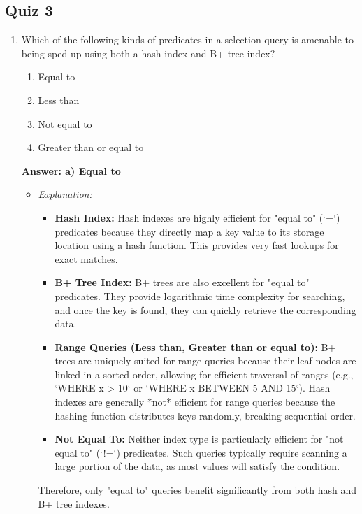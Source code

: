 \documentclass{article}
\begin{document}
\subsection*{Quiz 3}

\begin{enumerate}[label=\textbf{Question \arabic*.}]

    \item Which of the following kinds of predicates in a selection query is amenable to being sped up using both a hash index and B+ tree index?
        \begin{enumerate}[label=\alph*)]
            \item Equal to
            \item Less than
            \item Not equal to
            \item Greater than or equal to
        \end{enumerate}
        \textbf{Answer: a) Equal to}
        \begin{itemize}
            \item \textit{Explanation:}
            \begin{itemize}
                \item \textbf{Hash Index:} Hash indexes are highly efficient for "equal to" (`=`) predicates because they directly map a key value to its storage location using a hash function. This provides very fast lookups for exact matches.
                \item \textbf{B+ Tree Index:} B+ trees are also excellent for "equal to" predicates. They provide logarithmic time complexity for searching, and once the key is found, they can quickly retrieve the corresponding data.
                \item \textbf{Range Queries (Less than, Greater than or equal to):} B+ trees are uniquely suited for range queries because their leaf nodes are linked in a sorted order, allowing for efficient traversal of ranges (e.g., `WHERE x > 10` or `WHERE x BETWEEN 5 AND 15`). Hash indexes are generally *not* efficient for range queries because the hashing function distributes keys randomly, breaking sequential order.
                \item \textbf{Not Equal To:} Neither index type is particularly efficient for "not equal to" (`!=`) predicates. Such queries typically require scanning a large portion of the data, as most values will satisfy the condition.
            \end{itemize}
            Therefore, only "equal to" queries benefit significantly from both hash and B+ tree indexes.
        \end{itemize}
    

\end{enumerate}
\end{document}
